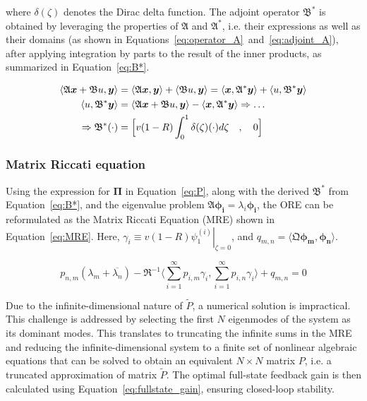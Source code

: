 where $\delta(\zeta)$ denotes the Dirac delta function. The adjoint operator $\mathfrak{B}^*$ is obtained by leveraging the properties of $\mathfrak{A}$ and $\mathfrak{A}^*$, i.e. their expressions as well as their domains (as shown in Equations~\ref{eq:operator_A}~and~\ref{eq:adjoint_A}), after applying integration by parts to the result of the inner products, as summarized in Equation~\ref{eq:B*}.

\begin{equation} \label{eq:B*}
    \begin{aligned}
        \langle \mathfrak{A} \bm{x} + \mathfrak{B} u, \bm{y} \rangle
        &= \langle \mathfrak{A} \bm{x}, \bm{y} \rangle
        + \langle \mathfrak{B} u, \bm{y} \rangle
        = \langle \bm{x}, \mathfrak{A}^* \bm{y}\rangle
        + \langle u, \mathfrak{B}^* \bm{y} \rangle \\
        \langle u, \mathfrak{B}^* \bm{y} \rangle
        &= \langle \mathfrak{A} \bm{x} + \mathfrak{B} u, \bm{y} \rangle
        - \langle \bm{x}, \mathfrak{A}^* \bm{y}\rangle
        \Rightarrow \hdots \\ \Rightarrow \mathfrak{B}^* (\cdot) &= \Bigl[ v(1-R) \int_0^1 \delta(\zeta) (\cdot) d\zeta \quad , \quad 0 \Bigr]
    \end{aligned}
\end{equation}

\subsubsection{Matrix Riccati equation}

Using the expression for $\mathbf{\Pi}$ in Equation~\ref{eq:P}, along with the derived $\mathfrak{B}^*$ from Equation~\ref{eq:B*}, and the eigenvalue problem $\mathfrak{A}\bm{\phi_i} = \lambda_i \bm{\phi_i}$, the ORE can be reformulated as the Matrix Riccati Equation (MRE) shown in Equation~\ref{eq:MRE}. Here, $\gamma_i \equiv v(1-R) \left. \psi_{1}^{(i)} \right|_{\zeta = 0}$, and $q_{m,n} = \langle \mathfrak{Q} \bm{\phi_m}, \bm{\phi_n} \rangle$.

\begin{equation}\label{eq:MRE}
    p_{n,m} (\lambda_m + \overline{\lambda_n})
    - \mathfrak{R}^{-1} \langle \sum_{i=1}^\infty p_{i,m} \gamma_i, \sum_{i=1}^\infty p_{i,n} \gamma_i \rangle
    + q_{m,n} = 0
\end{equation}

Due to the infinite-dimensional nature of $\tilde{P}$, a numerical solution is impractical. This challenge is addressed by selecting the first $N$ eigenmodes of the system as its dominant modes. This translates to truncating the infinite sums in the MRE and reducing the infinite-dimensional system to a finite set of nonlinear algebraic equations that can be solved to obtain an equivalent $N \times N$ matrix $P$, i.e. a truncated approximation of matrix $\tilde{P}$. The optimal full-state feedback gain is then calculated using Equation~\ref{eq:fullstate_gain}, ensuring closed-loop stability.

